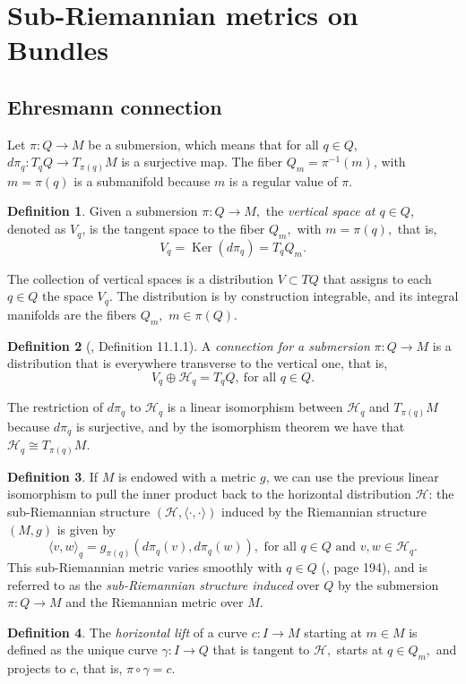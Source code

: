 \documentclass[12pt, letterpaper, reqno]{amsart}
\theoremstyle{definition}
\newtheorem{df}{Definition}
\theoremstyle{plain}
\theoremstyle{remark}
\begin{document}
\section{Sub-Riemannian metrics on Bundles}%
\label{sec:metrics_on_bundles}
\subsection{Ehresmann connection}%
\label{sub:ehresmann_connection}


Let $ \pi : Q \rightarrow {M} $ be a submersion, which means that for all $ q\in Q $, $ d\pi_q : T_q Q \rightarrow {T_{\pi(q)}}M $ is a surjective map. The fiber $ Q_m = \pi^{-1}(m) $, with $ m=\pi(q) $ is a submanifold because $ m $ is a regular value of $ \pi. $  

\begin{df}
	Given a submersion $ \pi:Q \rightarrow {M}, $ the \textit{vertical space at $ q\in Q $}, denoted as $ V_q $, is the tangent space to the fiber $ Q_m, $ with $ m=\pi(q), $ that is,  
	$$ V_q = \operatorname{Ker}(d\pi_q) = T_q Q_m.  $$ 
\end{df}

The collection of vertical spaces is a distribution $ V \subset TQ $ that assigns to each $ q\in Q $ the space $ V_q. $ The distribution is by construction integrable, and its integral manifolds are the fibers $ Q_m, $ $ m\in \pi(Q). $ 

\begin{df}[\cite{montgomery2002tour}, Definition 11.1.1]
	A \textit{connection for a submersion} $ \pi:Q \rightarrow {M} $ is a distribution that is everywhere transverse to the vertical one, that is,  
	$$ V_q \oplus \mathcal{H}_q = T_q Q,\ \text{for all } q\in Q. $$ 
\end{df}

The restriction of $ d\pi_q $ to $ \mathcal{H}_q $ is a linear isomorphism between $ \mathcal{H}_q $ and $ T_{\pi(q)} M $  because $ d\pi_q $ is surjective, and by the isomorphism theorem we have that $ \mathcal{H}_q\cong T_{\pi(q)} M $. 

\begin{df}\label{df:ind_sub_struc}
If $ M $ is endowed with a metric $ g $, we can use the previous linear isomorphism to pull the inner product back to the horizontal distribution $ \mathcal{H}$: the sub-Riemannian structure $ (\mathcal{H},\langle \cdot, \cdot\rangle) $ induced by the Riemannian structure $ (M,g) $ is given by
$$ \langle v,w \rangle_q = g_{\pi(q)} \left( d\pi_q(v), d\pi_q(w) \right), \text{ for all }q\in Q \text{ and } v,w\in \mathcal{H}_q.   $$ 
This sub-Riemannian metric varies smoothly with $ q\in Q $ (\cite{montgomery2002tour}, page 194), and is referred to as the \textit{sub-Riemannian structure induced} over $ Q $ by the submersion $ \pi: Q \rightarrow M $ and the Riemannian metric over $ M. $ 
\end{df}
\begin{df}
	The \textit{horizontal lift} of a curve $ c: I \rightarrow {M} $ starting at $ m\in M $ is defined as the unique curve $ \gamma : I \rightarrow {Q} $ that is tangent to $ \mathcal{H}, $ starts at $ q\in Q_m, $ and projects to $c$, that is, $ \pi\circ\gamma = c. $ 
\end{df}
\end{document}
